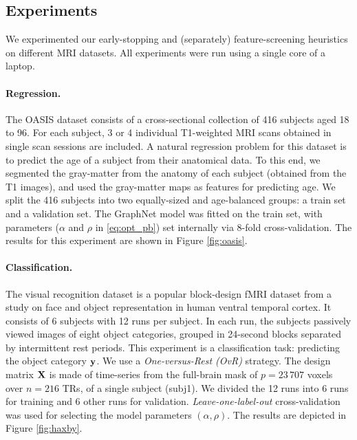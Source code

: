 \subsection{Experiments}
We experimented our early-stopping and (separately)
feature-screening heuristics on different MRI datasets.
All experiments were run using a single core of
  a laptop.

\paragraph{Regression.} The OASIS dataset
     \citep{marcus2007open} consists of a
    cross-sectional collection of 416 subjects aged 18 to 96. For each
    subject, 3 or 4 individual T1-weighted MRI scans obtained in
    single scan sessions are included.   A natural regression problem
    for this dataset is to predict the age of a subject from their
    anatomical data. To this end, we segmented the gray-matter from
    the anatomy of each subject (obtained from the T1 images), and
    used the gray-matter maps
    as features for predicting age. We split the 416 subjects into two
    equally-sized and age-balanced groups: a train set and a validation
    set. The GraphNet model  \citep{hebiri2011,grosenick2013} was fitted
    on the train set, with parameters
    ($\alpha$ and $\rho$ in \eqref{eq:opt_pb}) set internally via 8-fold
    cross-validation. The results for this experiment are shown in
    Figure \ref{fig:oasis}.

\paragraph{Classification.} The visual
    recognition dataset  \citep{haxby2001} is a popular block-design
    fMRI dataset from a
    study on face and object representation in human ventral temporal
    cortex.
It consists of 6 subjects with 12 runs per subject. In each run, the
subjects
passively viewed images of eight object categories, grouped
in 24-second blocks separated by intermittent rest periods. This
experiment is a classification task: predicting the object category
$\mathbf{y}$. We use a \textit{One-versus-Rest (OvR)} strategy. The design
matrix $\mathbf{X}$ is made of
time-series from the full-brain mask of $p = 23\,707$ voxels over $n =
216$ TRs, of a single subject (subj1). We divided the 12 runs into 6
runs for training and 6 other runs for
validation. \textit{Leave-one-label-out} cross-validation was used for
selecting the model parameters $(\alpha, \rho)$. The results are
depicted in Figure \ref{fig:haxby}.

